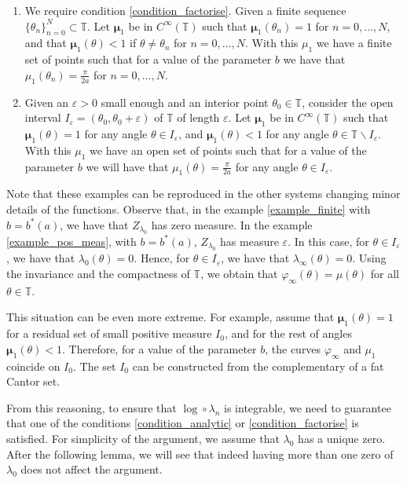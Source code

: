 \documentclass[12pt]{article}
\newcommand{\T}{\mathbb{T}}
\theoremstyle{plain}
\theoremstyle{remark}
\theoremstyle{definition}
\begin{document}
\begin{enumerate}
    \item\label{example_finite} We require condition \ref{condition_factorise}. Given a finite sequence $\{\theta_n\}_{n=0}^N\subset\T$. Let $\boldsymbol\mu_1$ be in $C^\infty(\T)$ such that $\boldsymbol\mu_1(\theta_n)=1$ for $n=0,\dots,N$, and that $\boldsymbol\mu_1(\theta)<1$ if $\theta\not=\theta_n$ for $n=0,\dots,N$. With this $\mu_1$ we have a finite set of points such that for a value of the parameter $b$ we have that $\mu_1(\theta_n)=\frac{\pi}{2a}$ for $n=0,\dots,N$.
    \item\label{example_pos_meas} Given an $\varepsilon>0$ small enough and an interior point $\theta_0\in\T$, consider the open interval $I_\varepsilon = (\theta_0,\theta_0+\varepsilon)$ of $\T$ of length $\varepsilon$.  Let $\boldsymbol\mu_1$ be in $C^\infty(\T)$ such that $\boldsymbol\mu_1(\theta)=1$ for any angle $\theta\in I_\varepsilon$, and $\boldsymbol\mu_1(\theta)<1$ for any angle $\theta\in \T\smallsetminus I_\varepsilon$. With this $\mu_1$ we have an open set of points such that for a value of the parameter $b$ we will have that $\mu_1(\theta)=\frac{\pi}{2a}$ for any angle $\theta\in I_\varepsilon$.
\end{enumerate}
Note that these examples can be reproduced in the other systems changing minor details of the functions.
Observe that, in the example \ref{example_finite} with $b=b^*(a)$, we have that $Z_{\lambda_0}$ has zero measure. In the example \ref{example_pos_meas}, with $b=b^*(a)$, $Z_{\lambda_0}$ has measure $\varepsilon$. In this case, for $\theta\in I_\varepsilon$, we have that $\lambda_0(\theta)=0$. Hence, for $\theta\in I_\varepsilon$, we have that $\lambda_\infty(\theta)=0$. Using the invariance and the compactness of $\T$, we obtain that $\varphi_\infty(\theta)=\mu(\theta)$ for all $\theta\in\T$. 

This situation can be even more extreme. For example, assume that $\boldsymbol\mu_1(\theta)=1$ for a residual set of small positive measure $I_0$, and for the rest of angles $\boldsymbol\mu_1(\theta)<1$. Therefore, for a value of the parameter $b$, the curves $\varphi_\infty$ and $\mu_1$ coincide on $I_0$. The set $I_0$ can be constructed from the complementary of a fat Cantor set. 

From this reasoning, to ensure that $\log\circ\lambda_n$ is integrable, we need to guarantee that one of the conditions \ref{condition_analytic} or \ref{condition_factorise} is satisfied.
For simplicity of the argument, we assume that $\lambda_0$ has a unique zero. After the following lemma, we will see that indeed having more than one zero of $\lambda_0$ does not affect the argument.
\end{document}
